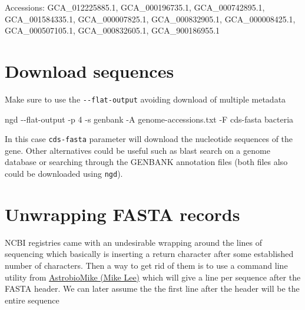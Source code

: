 \documentclass[
  letterpaper,
]{scrbook}
\newenvironment{Shaded}{\begin{snugshade}}{\end{snugshade}}
\newcommand{\AttributeTok}[1]{\textcolor[rgb]{0.40,0.46,0.14}{#1}}
\newcommand{\ControlFlowTok}[1]{\textcolor[rgb]{0.00,0.46,0.62}{#1}}
\newcommand{\ExtensionTok}[1]{\textcolor[rgb]{0.00,0.46,0.62}{#1}}
\newcommand{\FunctionTok}[1]{\textcolor[rgb]{0.28,0.35,0.67}{#1}}
\newcommand{\KeywordTok}[1]{\textcolor[rgb]{0.00,0.46,0.62}{#1}}
\newcommand{\NormalTok}[1]{\textcolor[rgb]{0.00,0.46,0.62}{#1}}
\newcommand{\OperatorTok}[1]{\textcolor[rgb]{0.37,0.37,0.37}{#1}}
\newcommand{\PreprocessorTok}[1]{\textcolor[rgb]{0.68,0.00,0.00}{#1}}
\newcommand{\VariableTok}[1]{\textcolor[rgb]{0.07,0.07,0.07}{#1}}
\begin{document}
Accessions: GCA\_012225885.1, GCA\_000196735.1, GCA\_000742895.1,
GCA\_001584335.1, GCA\_000007825.1, GCA\_000832905.1, GCA\_000008425.1,
GCA\_000507105.1, GCA\_000832605.1, GCA\_900186955.1

\hypertarget{download-sequences}{%
\section*{Download sequences}\label{download-sequences}}

Make sure to use the \texttt{-\/-flat-output} avoiding download of
multiple metadata

\begin{Shaded}
\begin{Highlighting}[]
\ExtensionTok{ngd} \AttributeTok{{-}{-}flat{-}output} \AttributeTok{{-}p}\NormalTok{ 4 }\AttributeTok{{-}s}\NormalTok{ genbank }\AttributeTok{{-}A}\NormalTok{ genome{-}accessions.txt }\AttributeTok{{-}F}\NormalTok{ cds{-}fasta bacteria}
\end{Highlighting}
\end{Shaded}

In this case \texttt{cds-fasta} parameter will download the nucleotide
sequences of the gene. Other alternatives could be useful such as blast
search on a genome database or searching through the GENBANK annotation
files (both files also could be downloaded using \texttt{ngd}).

\hypertarget{unwrapping-fasta-records}{%
\section*{Unwrapping FASTA records}\label{unwrapping-fasta-records}}

NCBI registries came with an undesirable wrapping around the lines of
sequencing which basically is inserting a return character after some
established number of characters. Then a way to get rid of them is to
use a command line utility from
\href{https://github.com/AstrobioMike}{AstrobioMike (Mike Lee)} which
will give a line per sequence after the FASTA header. We can later
assume the the first line after the header will be the entire sequence

\begin{Shaded}
\end{Shaded}
\end{document}
